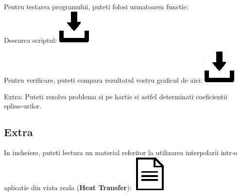 \documentclass{article}
\begin{document}
Pentru testarea programului, puteti folosi urmatoarea functie:\\
\tabto{0.5cm} Descarca scriptul:
\href{https://github.com/Iulian277/Interpolation/blob/main/Spline\%20C2\%20Natural/test_splineC2_natural.m}{\includegraphics[scale=0.35]{download_button}}


Pentru verificare, puteti compara rezultatul vostru graficul de aici: \href{https://github.com/Iulian277/Interpolation/blob/main/Spline\%20C2\%20Natural/splineC2_res.svg}{\includegraphics[scale=0.35]{download_button}}

Extra: Puteti rezolva problema si pe hartie si astfel determinati coeficientii spline-urilor.


\subsection{Extra}
\tab In incheiere, puteti lectura un material referitor la utilizarea interpolarii intr-o aplicatie din viata reala (\textbf{Heat Transfer}): \href{http://github.com/Iulian277/Interpolation/blob/main/Heat_Transfer_Interpolation.pdf}{\includegraphics[scale=0.4]{document_button}}
\end{document}
